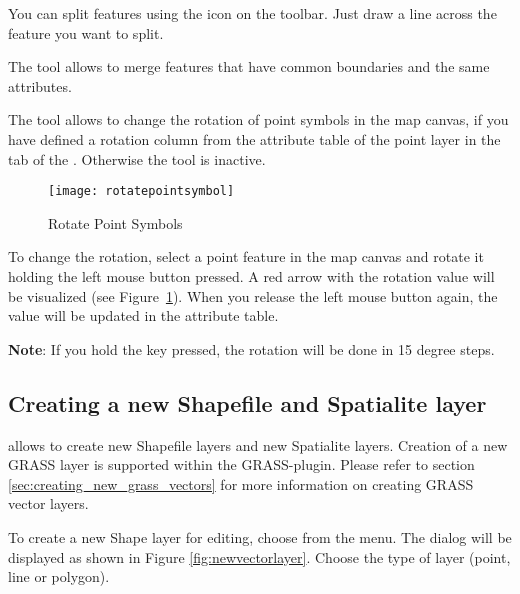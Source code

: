 You can split features using the  icon on the toolbar. Just draw a line across the feature you
want to split.


The  tool allows to
merge features that have common boundaries and the same attributes.


The  tool
allows to change the rotation of point symbols in the map canvas, if
you have defined a rotation column from the attribute table of the point
layer in the  tab of the .
Otherwise the tool is inactive.

\begin{figure}[ht]
   \centering
   \texttt{[image: rotatepointsymbol]}
   \caption{Rotate Point Symbols \nixcaption}\label{fig:rotatepoint}
\end{figure}

To change the rotation, select a point feature in the map canvas and rotate
it holding the left mouse button pressed. A red arrow with the rotation value
will be visualized (see Figure~\ref{fig:rotatepoint}). When you release the
left mouse button again, the value will be updated in the attribute table.

\textbf{Note}: If you hold the  key pressed, the rotation will be done
in 15 degree steps.

\subsection{Creating a new Shapefile and Spatialite layer}\label{sec:create shape}

\qg allows to create new Shapefile layers and new Spatialite layers.
Creation of a new GRASS layer is supported within the GRASS-plugin. Please refer
to section \ref{sec:creating_new_grass_vectors} for more information on
creating GRASS vector layers.

\label{sec:create shape}

To create a new Shape layer for editing, choose  \arrow
{} from the
 menu. The  dialog will be
displayed as shown in Figure \ref{fig:newvectorlayer}. Choose the type of
layer (point, line or polygon).

